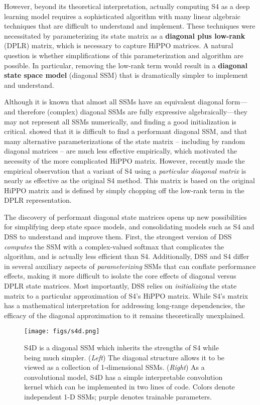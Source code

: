 \documentclass{article}
\begin{document}
However, beyond its theoretical interpretation,
actually computing S4 as a deep learning model requires a sophisticated algorithm with many linear algebraic techniques that are difficult to understand and implement.
These techniques were necessitated by parameterizing its state matrix as a \textbf{diagonal plus low-rank} (DPLR) matrix, which is necessary to capture HiPPO matrices.
A natural question is whether simplifications of this parameterization and algorithm are possible.
In particular, removing the low-rank term would result in a \textbf{diagonal state space model} (diagonal SSM) that is dramatically simpler to implement and understand. 

Although it is known that almost all SSMs have an equivalent diagonal form---and therefore (complex) diagonal SSMs are fully expressive algebraically---they may not represent all SSMs numerically, and finding a good initialization is critical.
\citet{gu2022efficiently} showed that it is difficult to find a performant diagonal SSM, and that many alternative parameterizations of the state matrix -- including by random diagonal matrices -- are much less effective empirically, which motivated the necessity of the more complicated HiPPO matrix.
However, recently \citet{gupta2022diagonal} made the empirical observation that a variant of S4 using a \emph{particular diagonal matrix} is nearly as effective as the original S4 method.
This matrix is based on the original HiPPO matrix and is defined by simply chopping off the low-rank term in the DPLR representation.

The discovery of performant diagonal state matrices opens up new possibilities for simplifying deep state space models,
and consolidating models such as S4 and DSS to understand and improve them.
First, the strongest version of DSS \emph{computes} the SSM with a complex-valued softmax that complicates the algorithm, and is actually less efficient than S4.
Additionally, DSS and S4 differ in several auxiliary aspects of \emph{parameterizing} SSMs that can conflate performance effects, making it more difficult to isolate the core effects of diagonal versus DPLR state matrices.
Most importantly, DSS relies on \emph{initializing} the state matrix to a particular approximation of S4's HiPPO matrix.
While S4's matrix has a mathematical interpretation for addressing long-range dependencies, the efficacy of the diagonal approximation to it remains theoretically unexplained.

\begin{figure}[!t]
\begin{minipage}{\linewidth}\centering
    \texttt{[image: figs/s4d.png]}
\end{minipage}
\caption{S4D is a diagonal SSM which inherits the strengths of S4 while being much simpler. (\emph{Left}) The diagonal structure allows it to be viewed as a collection of 1-dimensional SSMs. (\emph{Right}) As a convolutional model, S4D has a simple interpretable convolution kernel which can be implemented in two lines of code. Colors denote independent 1-D SSMs; purple denotes trainable parameters.}
\label{fig:1}
\end{figure}
\end{document}
